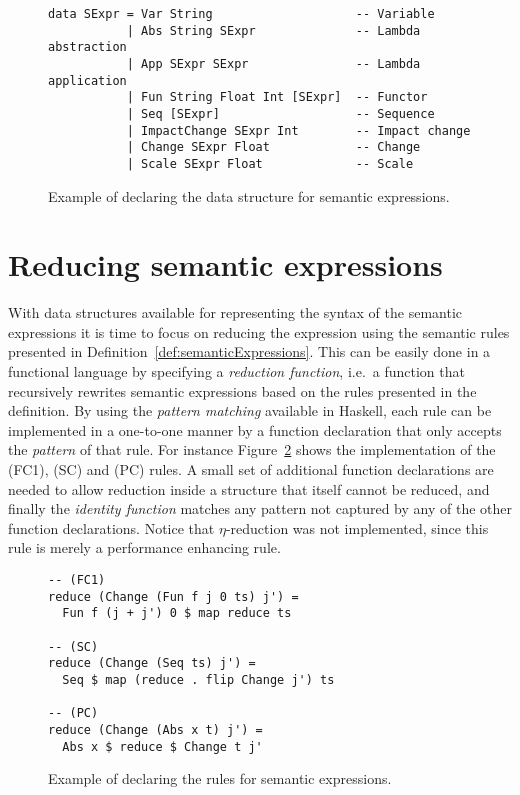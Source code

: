 \begin{figure}[ht]
\begin{cframed}{.9\textwidth}
\vspace{-8pt}
\begin{lstlisting}[language=GHC]
data SExpr = Var String                    -- Variable
           | Abs String SExpr              -- Lambda abstraction
           | App SExpr SExpr               -- Lambda application
           | Fun String Float Int [SExpr]  -- Functor
           | Seq [SExpr]                   -- Sequence
           | ImpactChange SExpr Int        -- Impact change
           | Change SExpr Float            -- Change
           | Scale SExpr Float             -- Scale
\end{lstlisting}	
\end{cframed}
\caption{Example of declaring the data structure for semantic expressions.}
\label{fig:lambdaDataType}
\end{figure}

\section{Reducing semantic expressions}

With data structures available for representing the syntax of the semantic expressions it is time to focus on reducing the expression using the semantic rules presented in Definition~\ref{def:semanticExpressions}. This can be easily done in a functional language by specifying a \emph{reduction function}, i.e.\ a function that recursively rewrites semantic expressions based on the rules presented in the definition. By using the \emph{pattern matching} available in Haskell, each rule can be implemented in a one-to-one manner by a function declaration that only accepts the \emph{pattern} of that rule. For instance Figure~\ref{fig:reduce} shows the implementation of the (FC1), (SC) and (PC) rules. A small set of additional function declarations are needed to allow reduction inside a structure that itself cannot be reduced, and finally the \emph{identity function} matches any pattern not captured by any of the other function declarations. Notice that $\eta$-reduction was not implemented, since this rule is merely a performance enhancing rule.
\begin{figure}[ht]
\begin{cframed}{.9\textwidth}
\vspace{-8pt}
\begin{lstlisting}[language=GHC]
-- (FC1)
reduce (Change (Fun f j 0 ts) j') = 
  Fun f (j + j') 0 $ map reduce ts

-- (SC)
reduce (Change (Seq ts) j') = 
  Seq $ map (reduce . flip Change j') ts

-- (PC)
reduce (Change (Abs x t) j') = 
  Abs x $ reduce $ Change t j'
\end{lstlisting}	
\end{cframed}
\caption{Example of declaring the rules for semantic expressions.}
\label{fig:reduce}
\end{figure}
\vspace{-1em}

